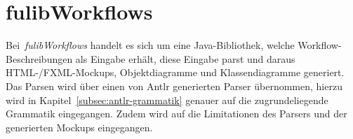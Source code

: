 \section{fulibWorkflows}\label{sec:fulibworkflows2}
Bei~\textit{fulibWorkflows} handelt es sich um eine Java-Bibliothek, welche Workflow-Beschreibungen als Eingabe erhält, diese Eingabe
parst und daraus HTML-/FXML-Mockups, Objektdiagramme und Klassendiagramme generiert.
Das Parsen wird über einen von Antlr generierten Parser übernommen, hierzu wird in Kapitel~\ref{subsec:antlr-grammatik} genauer auf
die zugrundeliegende Grammatik eingegangen.
Zudem wird auf die Limitationen des Parsers und der generierten Mockups eingegangen.








